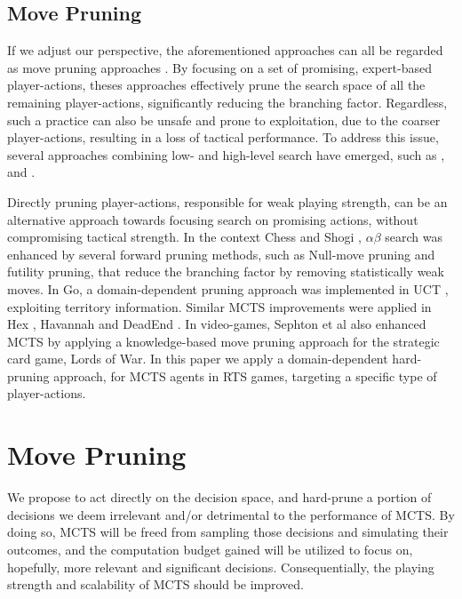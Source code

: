 \documentclass[conference]{IEEEtran}
\begin{document}
\subsection{Move Pruning}

If we adjust our perspective, the aforementioned approaches can all be regarded as move pruning approaches \cite{yang_integrating_2020}. By focusing on a set of promising, expert-based player-actions, theses approaches effectively prune the search space of all the remaining player-actions, significantly reducing the branching factor. Regardless, such a practice can also be unsafe and prone to exploitation, due to the coarser player-actions, resulting in a loss of tactical performance. To address this issue, several approaches combining low- and high-level search have emerged, such as \cite{barriga_combining_2017}, \cite{neufeld_hybrid_2019} and \cite{moraes_action_2018}.

Directly pruning player-actions, responsible for weak playing strength, can be an alternative approach towards focusing search on promising actions, without compromising tactical strength. In the context Chess \cite{heinz_adaptive_1999} and Shogi \cite{hoki_efficiency_2012}, $\alpha\beta$ search was enhanced by several forward pruning methods, such as Null-move pruning and futility pruning, that reduce the branching factor by removing statistically weak moves. In Go, a domain-dependent pruning approach was implemented in UCT \cite{huang_pruning_2010-1}, exploiting territory information. Similar MCTS improvements were applied in Hex \cite{arneson_monte_2010-1}, Havannah \cite{dugueperoux_pruning_2016} and DeadEnd \cite{he_game_2008-1}. In video-games, Sephton et al \cite{sephton_heuristic_2014} also enhanced MCTS by applying a knowledge-based move pruning approach for the strategic card game, Lords of War. In this paper we apply a domain-dependent hard-pruning approach, for MCTS agents in RTS games, targeting a specific type of player-actions.

\section{Move Pruning}

We propose to act directly on the decision space, and hard-prune a portion of decisions we deem irrelevant and/or detrimental to the performance of MCTS. By doing so, MCTS will be freed from sampling those decisions and simulating their outcomes, and the computation budget gained will be utilized to focus on, hopefully, more relevant and significant decisions. Consequentially, the playing strength and scalability of MCTS should be improved.
\end{document}
